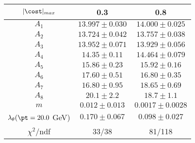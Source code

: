 \begin{tabular}{c|c|c}
$|\cost|_{max}$ & 0.3 & 0.8\\
\hline
$A_1$ & $13.997\pm0.030$ & $14.000\pm0.025$ \\
$A_2$ & $13.724\pm0.042$ & $13.757\pm0.038$ \\
$A_3$ & $13.952\pm0.071$ & $13.929\pm0.056$ \\
$A_4$ & $14.35\pm0.11$ & $14.464\pm0.079$ \\
$A_5$ & $15.86\pm0.23$ & $15.92\pm0.16$ \\
$A_6$ & $17.60\pm0.51$ & $16.80\pm0.35$ \\
$A_7$ & $16.80\pm0.95$ & $18.65\pm0.69$ \\
$A_8$ & $20.1\pm2.2$ & $18.7\pm1.1$ \\
$m$ & $0.012\pm0.013$ & $0.0017\pm0.0028$ \\
$\lambda_\theta(\pt = 20.0$ GeV) & $0.170\pm0.067$ & $0.098\pm0.027$ \\
\hline
$\chi^2$/ndf & 33/38 & 81/118
\end{tabular}
